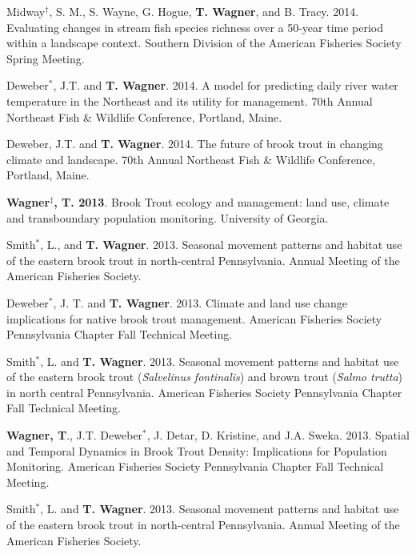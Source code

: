 \documentclass[10pt]{article}
\begin{document}
\begin{flushleft}
\begin{etaremune}
\item Midway$^\dagger$, S. M., S. Wayne, G. Hogue, {\bf T. Wagner}, and B. Tracy. 2014. Evaluating changes in stream fish species richness over a 50-year time period within a landscape context. Southern Division of the American Fisheries Society Spring Meeting. 

\item Deweber$^*$, J.T. and {\bf T. Wagner}. 2014. A model for predicting daily river water temperature in the Northeast and its utility for management. 70th Annual Northeast Fish \& Wildlife Conference, Portland, Maine.

\item Deweber, J.T. and  {\bf T. Wagner}. 2014. The future of brook trout in changing climate and landscape. 70th Annual Northeast Fish \& Wildlife Conference, Portland, Maine.


\item {\bf Wagner$^\ddagger$, T. 2013}. Brook Trout ecology and management: land use, climate and transboundary population monitoring. University of Georgia. 

\item Smith$^*$, L., and {\bf T. Wagner}. 2013. Seasonal movement patterns and habitat use of the eastern brook trout in north-central Pennsylvania. Annual Meeting of the American Fisheries Society. 

\item Deweber$^*$, J. T. and {\bf T. Wagner}. 2013. Climate and land use change implications for native brook trout management. American Fisheries Society Pennsylvania Chapter Fall Technical Meeting.

\item Smith$^*$, L. and {\bf T. Wagner}. 2013. Seasonal movement patterns and habitat use of the eastern brook trout (\emph{Salvelinus fontinalis}) and brown trout (\emph{Salmo trutta}) in north central Pennsylvania. American Fisheries Society Pennsylvania Chapter Fall Technical Meeting. 

\item {\bf Wagner, T}., J.T. Deweber$^*$, J. Detar, D. Kristine, and J.A. Sweka. 2013. Spatial and Temporal Dynamics in Brook Trout Density: Implications for Population Monitoring. American Fisheries Society Pennsylvania Chapter Fall Technical Meeting.

\item Smith$^*$, L. and {\bf T. Wagner}. 2013. Seasonal movement patterns and habitat use of the eastern brook trout in north-central Pennsylvania. Annual Meeting of the American Fisheries Society.


\end{etaremune}
\end{flushleft}
\end{document}
